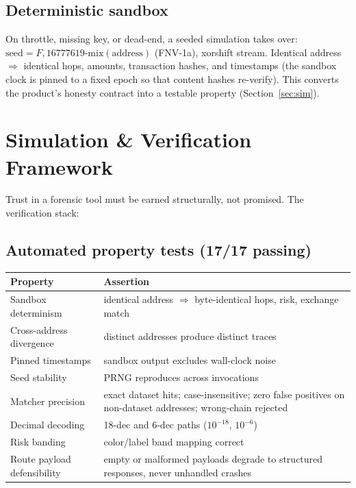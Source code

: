\documentclass[11pt,a4paper]{article}
\begin{document}
\subsection{Deterministic sandbox}
On throttle, missing key, or dead-end, a seeded simulation takes over:
$\mathrm{seed} = F{,}16777619{\text{-mix}}(\mathrm{address})$ (FNV-1a), xorshift
stream. Identical address $\Rightarrow$ identical hops, amounts, transaction
hashes, and timestamps (the sandbox clock is pinned to a fixed epoch so that
content hashes re-verify). This converts the product's honesty contract into a
testable property (Section~\ref{sec:sim}).

\section{Simulation \& Verification Framework}

Trust in a forensic tool must be earned structurally, not promised. The
verification stack:

\subsection{Automated property tests (17/17 passing)}
\begin{longtable}{@{}p{}p{}@{}}
\toprule
\textbf{Property} & \textbf{Assertion} \\
\midrule
Sandbox determinism & identical address $\Rightarrow$ byte-identical hops, risk, exchange match \\
Cross-address divergence & distinct addresses produce distinct traces \\
Pinned timestamps & sandbox output excludes wall-clock noise \\
Seed stability & PRNG reproduces across invocations \\
Matcher precision & exact dataset hits; case-insensitive; zero false positives on non-dataset addresses; wrong-chain rejected \\
Decimal decoding & 18-dec and 6-dec paths ($10^{-18}$, $10^{-6}$) \\
Risk banding & color/label band mapping correct \\
Route payload defensibility & empty or malformed payloads degrade to structured responses, never unhandled crashes \\
\bottomrule
\end{longtable}
\end{document}

